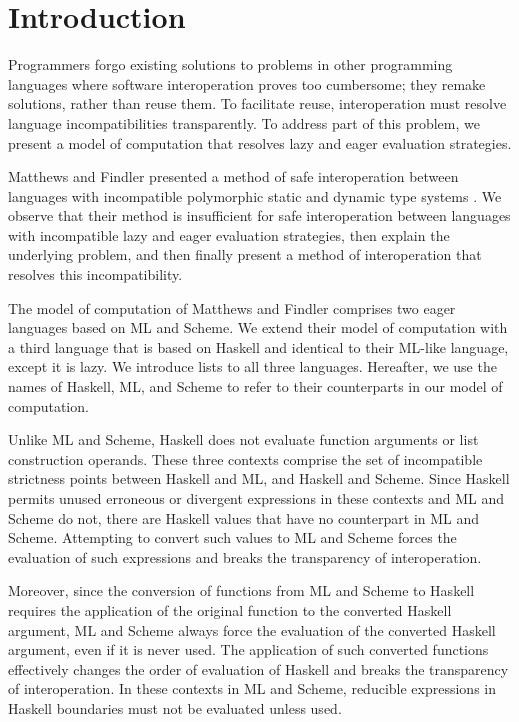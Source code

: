 \section{Introduction}

Programmers forgo existing solutions to problems in other programming languages where software interoperation proves too cumbersome; they remake solutions, rather than reuse them. To facilitate reuse, interoperation must resolve language incompatibilities transparently. To address part of this problem, we present a model of computation that resolves lazy and eager evaluation strategies.

Matthews and Findler presented a method of safe interoperation between languages with incompatible polymorphic static and dynamic type systems \cite{matthews07}. We observe that their method is insufficient for safe interoperation between languages with incompatible lazy and eager evaluation strategies, then explain the underlying problem, and then finally present a method of interoperation that resolves this incompatibility.

The model of computation of Matthews and Findler comprises two eager languages based on ML and Scheme. We extend their model of computation with a third language that is based on Haskell and identical to their ML-like language, except it is lazy. We introduce lists to all three languages. Hereafter, we use the names of Haskell, ML, and Scheme to refer to their counterparts in our model of computation.

Unlike ML and Scheme, Haskell does not evaluate function arguments or list construction operands. These three contexts comprise the set of incompatible strictness points between Haskell and ML, and Haskell and Scheme. Since Haskell permits unused erroneous or divergent expressions in these contexts and ML and Scheme do not, there are Haskell values that have no counterpart in ML and Scheme. Attempting to convert such values to ML and Scheme forces the evaluation of such expressions and breaks the transparency of interoperation.

Moreover, since the conversion of functions from ML and Scheme to Haskell requires the application of the original function to the converted Haskell argument, ML and Scheme always force the evaluation of the converted Haskell argument, even if it is never used. The application of such converted functions effectively changes the order of evaluation of Haskell and breaks the transparency of interoperation. In these contexts in ML and Scheme, reducible expressions in Haskell boundaries must not be evaluated unless used.

